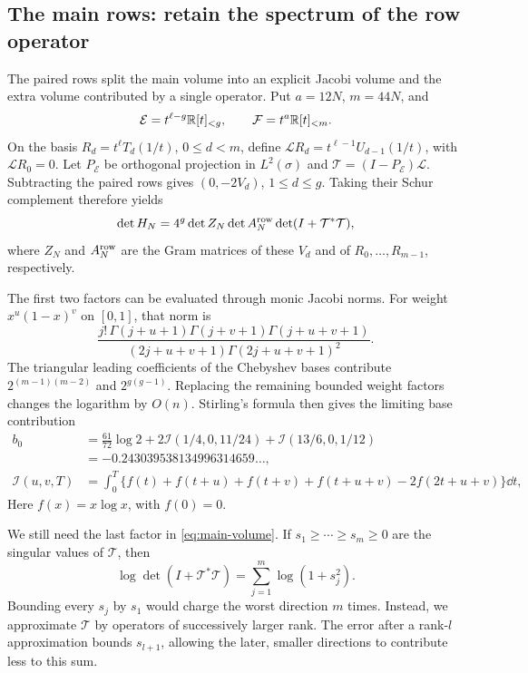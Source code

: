 \subsection{The main rows: retain the spectrum of the row operator}

The paired rows split the main volume into an explicit Jacobi volume
and the extra volume contributed by a single operator. Put
$a=12N$, $m=44N$, and
\[
 \mathcal E=t^{\ell-g}\mathbb R[t]_{<g},\qquad
 \mathcal F=t^a\mathbb R[t]_{<m}.
\]
On the basis $R_d=t^\ell T_d(1/t)$, $0\le d<m$, define
$\mathcal L R_d=t^{\ell-1}U_{d-1}(1/t)$, with $\mathcal LR_0=0$.
Let $P_{\mathcal E}$ be orthogonal projection in $L^2(\sigma)$ and
$\mathcal T=(I-P_{\mathcal E})\mathcal L$. Subtracting the paired
rows gives $(0,-2V_d)$, $1\le d\le g$. Taking their Schur complement
therefore yields
\begin{equation}\label{eq:main-volume}
 \det H_N=4^g\det Z_N\det A_N^{\rm row}
                        \det(I+\mathcal T^*\mathcal T),
\end{equation}
where $Z_N$ and $A_N^{\rm row}$ are the Gram matrices of these $V_d$
and of $R_0,\ldots,R_{m-1}$, respectively.

The first two factors can be evaluated through monic Jacobi norms.
For weight $x^u(1-x)^v$ on $[0,1]$, that norm is
\[
 \frac{j!\,\Gamma(j+u+1)\Gamma(j+v+1)\Gamma(j+u+v+1)}
 {(2j+u+v+1)\Gamma(2j+u+v+1)^2}.
\]
The triangular leading coefficients of the Chebyshev bases contribute
$2^{(m-1)(m-2)}$ and $2^{g(g-1)}$. Replacing the remaining bounded
weight factors changes the logarithm by $O(n)$. Stirling's formula
then gives the limiting base contribution
\begin{align*}
 b_0&=\tfrac{61}{72}\log2+2\mathcal I(1/4,0,11/24)
                         +\mathcal I(13/6,0,1/12)\\
 &=-0.243039538134996314659\ldots,\\
 \mathcal I(u,v,T)&=\int_0^T
 \{f(t)+f(t+u)+f(t+v)+f(t+u+v)-2f(2t+u+v)\}\dd t,
\end{align*}
Here $f(x)=x\log x$, with $f(0)=0$.

We still need the last factor in \eqref{eq:main-volume}. If
$s_1\ge\cdots\ge s_m\ge0$ are the singular values of $\mathcal T$, then
\[
 \log\det(I+\mathcal T^*\mathcal T)
                =\sum_{j=1}^m\log(1+s_j^2).
\]
Bounding every $s_j$ by $s_1$ would charge the worst direction $m$ times.
Instead, we approximate $\mathcal T$ by operators of successively larger
rank. The error after a rank-$l$ approximation bounds $s_{l+1}$, allowing
the later, smaller directions to contribute less to this sum.

